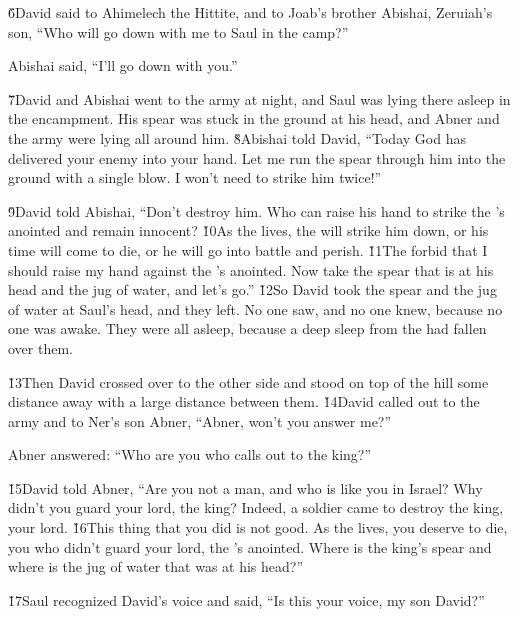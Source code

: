 \v{6}David said to Ahimelech the Hittite, and to Joab's brother Abishai, Zeruiah's son, ``Who will go down with me to Saul in the camp?''

Abishai said, ``I'll go down with you.''

\v{7}David and Abishai went to the army at night, and Saul was lying there asleep in the encampment. His spear was stuck in the ground at his head, and Abner and the army were lying all around him. \v{8}Abishai told David, ``Today God has delivered your enemy into your hand. Let me run the spear through him into the ground with a single blow. I won't need to strike him twice!''

\v{9}David told Abishai, ``Don't destroy him. Who can raise his hand to strike the 's anointed and remain innocent? \v{10}As the  lives, the  will strike him down, or his time will come to die, or he will go into battle and perish. \v{11}The  forbid that I should raise my hand against the 's anointed. Now take the spear that is at his head and the jug of water, and let's go.'' \v{12}So David took the spear and the jug of water at Saul's head, and they left. No one saw, and no one knew, because no one was awake. They were all asleep, because a deep sleep from the  had fallen over them.

\v{13}Then David crossed over to the other side and stood on top of the hill some distance away with a large distance between them. \v{14}David called out to the army and to Ner's son Abner, ``Abner, won't you answer me?''

Abner answered: ``Who are you who calls out to the king?''

\v{15}David told Abner, ``Are you not a man, and who is like you in Israel? Why didn't you guard your lord, the king? Indeed, a soldier came to destroy the king, your lord. \v{16}This thing that you did is not good. As the  lives, you deserve to die, you who didn't guard your lord, the 's anointed. Where is the king's spear and where is the jug of water that was at his head?''

\v{17}Saul recognized David's voice and said, ``Is this your voice, my son David?''

